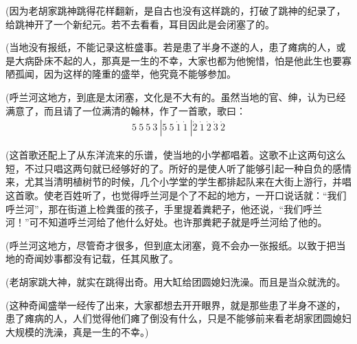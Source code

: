 \par (因为老胡家跳神跳得花样翻新，是自古也没有这样跳的，打破了跳神的纪录了，给跳神开了一个新纪元。若不去看看，耳目因此是会闭塞了的。
\par (当地没有报纸，不能记录这桩盛事。若是患了半身不遂的人，患了瘫病的人，或是大病卧床不起的人，那真是一生的不幸，大家也都为他惋惜，怕是他此生也要寡陋孤闻，因为这样的隆重的盛举，他究竟不能够参加。
\par (呼兰河这地方，到底是太闭塞，文化是不大有的。虽然当地的官、绅，认为已经满意了，而且请了一位满清的翰林，作了一首歌，歌曰：
\begin{gather*}
    5\ 5\ 5\ 3\ | 5\ 5\ \dot{1}\ \dot{1}\ | \dot{2}\ \dot{1}\ \dot{2}\ \dot{3}\ \dot{2}
\end{gather*}
\par (这首歌还配上了从东洋流来的乐谱，使当地的小学都唱着。这歌不止这两句这么短，不过只唱这两句就已经够好的了。所好的是使人听了能够引起一种自负的感情来，尤其当清明植树节的时候，几个小学堂的学生都排起队来在大街上游行，并唱这首歌。使老百姓听了，也觉得呼兰河是个了不起的地方，一开口说话就：“我们呼兰河”，那在街道上检粪蛋的孩子，手里提着粪耙子，他还说，“我们呼兰河！”可不知道呼兰河给了他什么好处。也许那粪耙子就是呼兰河给了他的。
\par (呼兰河这地方，尽管奇才很多，但到底太闭塞，竟不会办一张报纸。以致于把当地的奇闻妙事都没有记载，任其风散了。
\par (老胡家跳大神，就实在跳得出奇。用大缸给团圆媳妇洗澡。而且是当众就洗的。
\par (这种奇闻盛举一经传了出来，大家都想去开开眼界，就是那些患了半身不遂的，患了瘫病的人，人们觉得他们瘫了倒没有什么，只是不能够前来看老胡家团圆媳妇大规模的洗澡，真是一生的不幸。)
